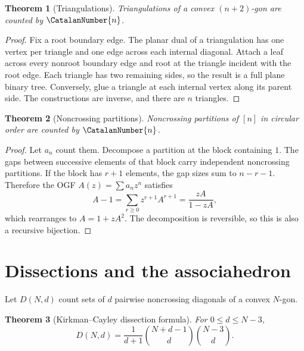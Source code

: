 \documentclass[11pt,a4paper,oneside,openany]{book}
\newtheorem{theorem}{Theorem}[chapter]
\theoremstyle{definition}
\theoremstyle{remark}
\begin{document}
\begin{theorem}[Triangulations]
\label{thm:merged-triangulations}
Triangulations of a convex $(n+2)$-gon are counted by $\CatalanNumber{n}$.
\end{theorem}

\begin{proof}
Fix a root boundary edge.  The planar dual of a triangulation has one vertex
per triangle and one edge across each internal diagonal.  Attach a leaf across
every nonroot boundary edge and root at the triangle incident with the root
edge.  Each triangle has two remaining sides, so the result is a full plane
binary tree.  Conversely, glue a triangle at each internal vertex along its
parent side.  The constructions are inverse, and there are $n$ triangles.
\end{proof}

\begin{theorem}[Noncrossing partitions]
\label{thm:merged-noncrossing}
Noncrossing partitions of $[n]$ in circular order are counted by $\CatalanNumber{n}$.
\end{theorem}

\begin{proof}
Let $a_n$ count them.  Decompose a partition at the block containing $1$.
The gaps between successive elements of that block carry independent
noncrossing partitions.  If the block has $r+1$ elements, the gap sizes sum to
$n-r-1$.  Therefore the OGF $A(z)=\sum a_nz^n$ satisfies
\[
 A-1=\sum_{r\geq0}z^{r+1}A^{r+1}=\frac{zA}{1-zA},
\]
which rearranges to $A=1+zA^2$.  The decomposition is reversible, so this is
also a recursive bijection.
\end{proof}

\section{Dissections and the associahedron}

Let $D(N,d)$ count sets of $d$ pairwise noncrossing diagonals of a convex
$N$-gon.

\begin{theorem}[Kirkman--Cayley dissection formula]
\label{thm:merged-kirkman-cayley}
For $0\leq d\leq N-3$,
\begin{equation}
 D(N,d)=\frac1{d+1}\binom{N+d-1}{d}\binom{N-3}{d}.                 \label{eq:merged-kirkman-cayley}
\end{equation}
\end{theorem}
\end{document}
